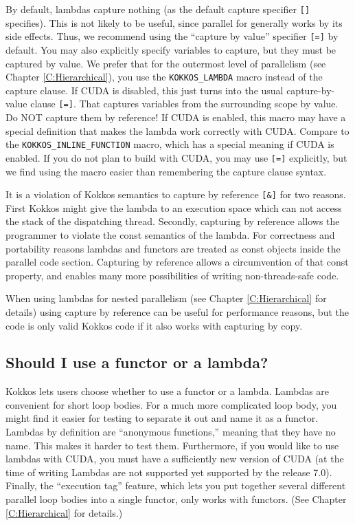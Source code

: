 By default, lambdas capture nothing (as the default capture specifier \lstinline![]! specifies).
This is not likely to be useful, since parallel for generally works by its side effects.
Thus, we recommend using the ``capture by value'' specifier \lstinline![=]! by default.
You may also explicitly specify variables to capture, but they must be captured by value.
We prefer that for the outermost level of parallelism (see Chapter \ref{C:Hierarchical}),
you use the \lstinline!KOKKOS_LAMBDA! macro instead of the capture clause.
If CUDA is disabled, this just turns into the usual capture-by-value clause \lstinline![=]!.
That captures variables from the surrounding scope by value.
Do NOT capture them by reference!
If CUDA is enabled, this macro may have a special definition 
that makes the lambda work correctly with CUDA.
Compare to the \lstinline!KOKKOS_INLINE_FUNCTION! macro,
which has a special meaning if CUDA is enabled.
If you do not plan to build with CUDA, you may use \lstinline![=]! explicitly,
but we find using the macro easier than remembering the capture clause syntax.

It is a violation of Kokkos semantics to capture by reference \lstinline|[&]| for two reasons.
First Kokkos might give the lambda to an execution space which can not access the stack of 
the dispatching thread. Secondly, capturing by reference allows the programmer to violate the 
const semantics of the lambda. For correctness and portability reasons lambdas and functors are
treated as const objects inside the parallel code section. Capturing by reference allows a circumvention
of that const property, and enables many more possibilities of writing non-threads-safe code.

When using lambdas for nested parallelism (see Chapter \ref{C:Hierarchical} for details) using
capture by reference can be useful for performance reasons, but the code is only valid Kokkos
code if it also works with capturing by copy.

\subsection{Should I use a functor or a lambda?}

Kokkos lets users choose whether to use a functor or a lambda.
Lambdas are convenient for short loop bodies.
For a much more complicated loop body,
you might find it easier for testing to separate it out and name it as a functor.
Lambdas by definition are ``anonymous functions,'' meaning that they have no name.
This makes it harder to test them.
Furthermore, if you would like to use lambdas with CUDA,
you must have a sufficiently new version of CUDA (at the time of writing Lambdas are not supported yet supported by the release 7.0).
Finally, the ``execution tag'' feature, which lets you put together several different parallel loop bodies into a single functor,
only works with functors.  (See Chapter \ref{C:Hierarchical} for details.)

